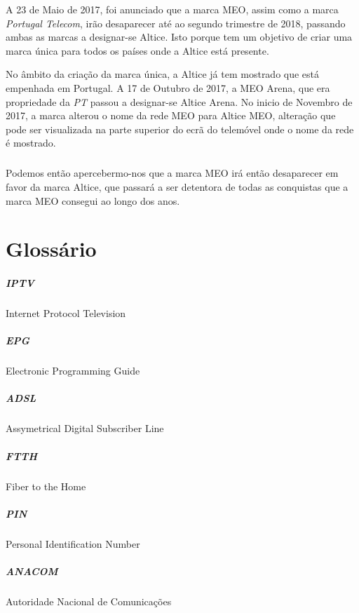 \documentclass{report}
\begin{document}
	A 23 de Maio de 2017, foi anunciado que a marca MEO, assim como a marca \textit{Portugal Telecom}, irão desaparecer até ao segundo trimestre de 2018, passando ambas as marcas a designar-se Altice. Isto porque tem um objetivo de criar uma marca única para todos os países onde a Altice está presente. 
	
	No âmbito da criação da marca única, a Altice já tem mostrado que está empenhada em Portugal. A 17 de Outubro de 2017, a MEO Arena, que era propriedade da \textit{PT} passou a designar-se Altice Arena. No inicio de Novembro de 2017, a marca alterou o nome da rede MEO para Altice MEO, alteração que pode ser visualizada na parte superior do ecrã do telemóvel onde o nome da rede é mostrado.
	
\paragraph{}
	Podemos então apercebermo-nos que a marca MEO irá então desaparecer em favor da marca Altice, que passará a ser detentora de todas as conquistas que a marca MEO consegui ao longo dos anos.

\newpage

\chapter*{Glossário}

\paragraph{IPTV} Internet Protocol Television
\paragraph{EPG} Electronic Programming Guide
\paragraph{ADSL} Assymetrical Digital Subscriber Line
\paragraph{FTTH} Fiber to the Home
\paragraph{PIN} Personal Identification Number
\paragraph{ANACOM} Autoridade Nacional de Comunicações
\end{document}
